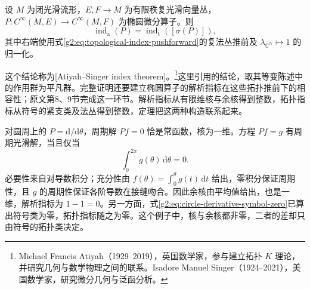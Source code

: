 \begin{theorem}\label{g2:thm:atiyah-singer-topological-index}
	设 \(M\) 为闭光滑流形，\(E,F\to M\) 为有限秩复光滑向量丛，\(P:C^\infty(M,E)\to C^\infty(M,F)\) 为椭圆微分算子。则
	\[
		\operatorname{ind}_{\mathrm a}(P)
		=\operatorname{ind}_{\mathrm t}([\sigma(P)]),
	\]
	其中右端使用式\eqref{g2:eq:topological-index-pushforward}的复法丛推前及 \(\lambda_{\mathbb C^N}\mapsto1\) 的归一化。
\end{theorem}

这个结论称为[Atiyah--Singer index theorem]。\footnote{Michael Francis Atiyah（1929--2019），英国数学家，参与建立拓扑 \(K\) 理论，并研究几何与数学物理之间的联系。Isadore Manuel Singer（1924--2021），美国数学家，研究微分几何与泛函分析。}这里引用\cite[第6节，定理(6.7)，第520页]{AtiyahSinger1968I}的结论，取其等变陈述中的作用群为平凡群。完整证明还要建立椭圆算子的解析指标在这些拓扑推前下的相容性；原文第8、9节完成这一环节。解析指标从有限维核与余核得到整数，拓扑指标从符号的紧支类及法丛得到整数，定理把这两种构造联系起来。

\begin{example}\label{g2:exm:circle-derivative-index}
	对圆周上的 \(P=\mathrm d/\mathrm d\theta\)，周期解 \(Pf=0\) 恰是常函数，核为一维。方程 \(Pf=g\) 有周期光滑解，当且仅当
	\[
		\int_0^{2\pi}g(\theta)\,\mathrm d\theta=0.
	\]
	必要性来自对导数积分；充分性由 \(f(\theta)=\int_0^\theta g(t)\,\mathrm dt\) 给出，零积分保证周期性，且 \(g\) 的周期性保证各阶导数在接缝吻合。因此余核由平均值给出，也是一维，解析指标为 \(1-1=0\)。另一方面，式\eqref{g2:eq:circle-derivative-symbol-zero}已算出符号类为零，拓扑指标随之为零。这个例子中，核与余核都非零，二者的差却只由符号的拓扑类决定。
\end{example}
